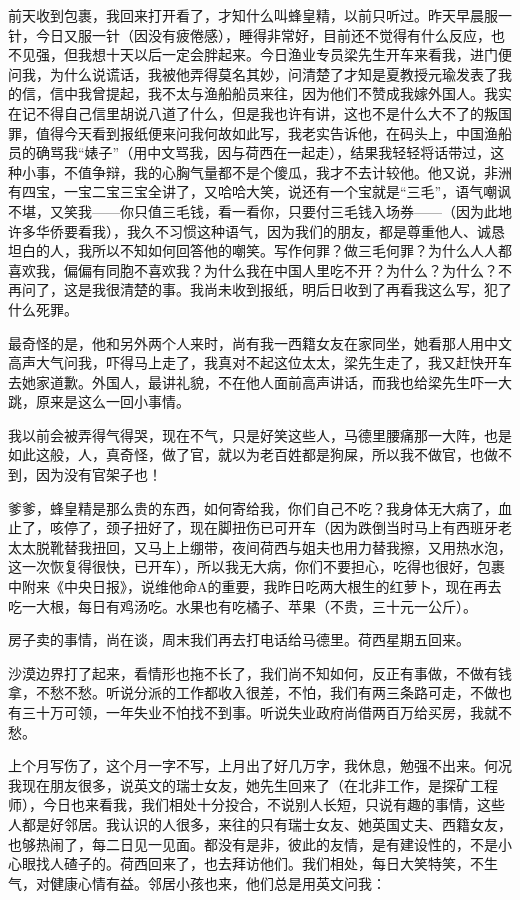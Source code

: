 \par {}
\par 前天收到包裹，我回来打开看了，才知什么叫蜂皇精，以前只听过。昨天早晨服一针，今日又服一针（因没有疲倦感），睡得非常好，目前还不觉得有什么反应，也不见强，但我想十天以后一定会胖起来。今日渔业专员梁先生开车来看我，进门便问我，为什么说谎话，我被他弄得莫名其妙，问清楚了才知是夏教授元瑜发表了我的信，信中我曾提起，我不太与渔船船员来往，因为他们不赞成我嫁外国人。我实在记不得自己信里胡说八道了什么，但是我也许有讲，这也不是什么大不了的叛国罪，值得今天看到报纸便来问我何故如此写，我老实告诉他，在码头上，中国渔船员的确骂我“婊子”（用中文骂我，因与荷西在一起走），结果我轻轻将话带过，这种小事，不值争辩，我的心胸气量都不是个傻瓜，我才不去计较他。他又说，非洲有四宝，一宝二宝三宝全讲了，又哈哈大笑，说还有一个宝就是“三毛”，语气嘲讽不堪，又笑我——你只值三毛钱，看一看你，只要付三毛钱入场券——（因为此地许多华侨要看我），我久不习惯这种语气，因为我们的朋友，都是尊重他人、诚恳坦白的人，我所以不知如何回答他的嘲笑。写作何罪？做三毛何罪？为什么人人都喜欢我，偏偏有同胞不喜欢我？为什么我在中国人里吃不开？为什么？为什么？不再问了，这是我很清楚的事。我尚未收到报纸，明后日收到了再看我这么写，犯了什么死罪。
\par 最奇怪的是，他和另外两个人来时，尚有我一西籍女友在家同坐，她看那人用中文高声大气问我，吓得马上走了，我真对不起这位太太，梁先生走了，我又赶快开车去她家道歉。外国人，最讲礼貌，不在他人面前高声讲话，而我也给梁先生吓一大跳，原来是这么一回小事情。
\par 我以前会被弄得气得哭，现在不气，只是好笑这些人，马德里腰痛那一大阵，也是如此这般，人，真奇怪，做了官，就以为老百姓都是狗屎，所以我不做官，也做不到，因为没有官架子也！
\par 爹爹，蜂皇精是那么贵的东西，如何寄给我，你们自己不吃？我身体无大病了，血止了，咳停了，颈子扭好了，现在脚扭伤已可开车（因为跌倒当时马上有西班牙老太太脱靴替我扭回，又马上上绷带，夜间荷西与姐夫也用力替我擦，又用热水泡，这一次恢复得很快，已开车），所以我无大病，你们不要担心，吃得也很好，包裹中附来《中央日报》，说维他命A的重要，我昨日吃两大根生的红萝卜，现在再去吃一大根，每日有鸡汤吃。水果也有吃橘子、苹果（不贵，三十元一公斤）。
\par 房子卖的事情，尚在谈，周末我们再去打电话给马德里。荷西星期五回来。
\par 沙漠边界打了起来，看情形也拖不长了，我们尚不知如何，反正有事做，不做有钱拿，不愁不愁。听说分派的工作都收入很差，不怕，我们有两三条路可走，不做也有三十万可领，一年失业不怕找不到事。听说失业政府尚借两百万给买房，我就不愁。
\par 上个月写伤了，这个月一字不写，上月出了好几万字，我休息，勉强不出来。何况我现在朋友很多，说英文的瑞士女友，她先生回来了（在北非工作，是探矿工程师），今日也来看我，我们相处十分投合，不说别人长短，只说有趣的事情，这些人都是好邻居。我认识的人很多，来往的只有瑞士女友、她英国丈夫、西籍女友，也够热闹了，每二日见一见面。都没有是非，彼此的友情，是有建设性的，不是小心眼找人碴子的。荷西回来了，也去拜访他们。我们相处，每日大笑特笑，不生气，对健康心情有益。邻居小孩也来，他们总是用英文问我：
